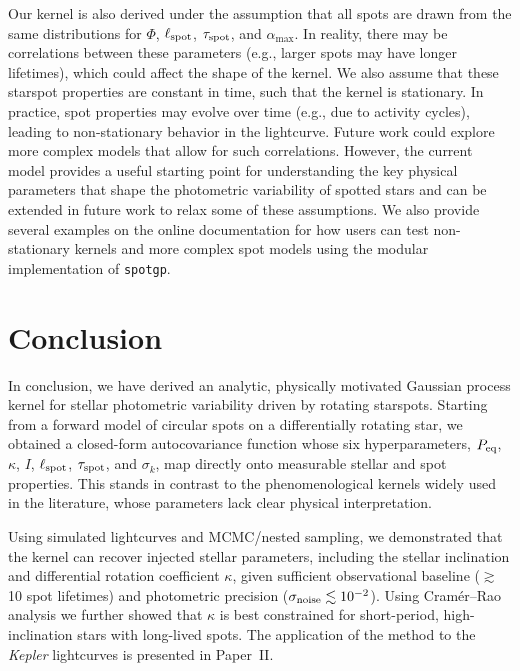 \documentclass[preprint]{aastex702}
\newcommand{\kepler}{{\it Kepler}\xspace}
\newcommand{\code}[1]{{\texttt{#1}}}
\begin{document}
Our kernel is also derived under the assumption that all spots are drawn from the same distributions for $\Phi$, $\ell_{\rm spot}$, $\tau_{\rm spot}$, and $\alpha_{\max}$. In reality, there may be correlations between these parameters (e.g., larger spots may have longer lifetimes), which could affect the shape of the kernel. We also assume that these starspot properties are constant in time, such that the kernel is stationary. In practice, spot properties may evolve over time (e.g., due to activity cycles), leading to non-stationary behavior in the lightcurve. Future work could explore more complex models that allow for such correlations. However, the current model provides a useful starting point for understanding the key physical parameters that shape the photometric variability of spotted stars and can be extended in future work to relax some of these assumptions. We also provide several examples on the online documentation for how users can test non-stationary kernels and more complex spot models using the modular implementation of \code{spotgp}.

\vspace{\baselineskip}
\section{Conclusion} \label{sec:conclusion}

In conclusion, we have derived an analytic, physically motivated Gaussian process kernel for stellar photometric variability driven by rotating starspots. Starting from a forward model of circular spots on a differentially rotating star, we obtained a closed-form autocovariance function whose six hyperparameters, $P_{\rm eq}$, $\kappa$, $I$, $\ell_{\rm spot}$, $\tau_{\rm spot}$, and $\sigma_k$, map directly onto measurable stellar and spot properties. This stands in contrast to the phenomenological kernels widely used in the literature, whose parameters lack clear physical interpretation.

Using simulated lightcurves and MCMC/nested sampling, we demonstrated that the kernel can recover injected stellar parameters, including the stellar inclination and differential rotation coefficient $\kappa$, given sufficient observational baseline ($\gtrsim$10 spot lifetimes) and photometric precision ($\sigma_{\rm noise} \lesssim 10^{-2}$). Using Cram\'{e}r--Rao analysis we further showed that $\kappa$ is best constrained for short-period, high-inclination stars with long-lived spots. The application of the method to the \kepler lightcurves is presented in Paper~II.
\end{document}
